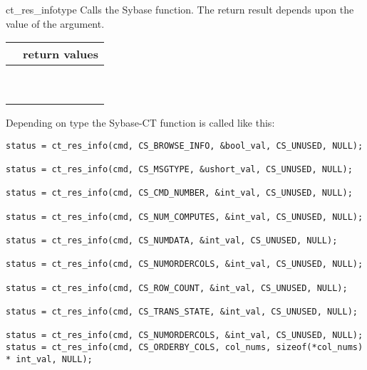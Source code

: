 \begin{methoddesc}[CS_COMMAND]{ct_res_info}{type}
Calls the Sybase  function.  The return result
depends upon the value of the  argument.

\begin{longtable}{l|l}
\var{type} & return values \\
\hline
\code{CS_BROWSE_INFO}   & \code{status, bool} \\
\code{CS_CMD_NUMBER}    & \code{status, int} \\
\code{CS_MSGTYPE}       & \code{status, int} \\
\code{CS_NUM_COMPUTES}  & \code{status, int} \\
\code{CS_NUMDATA}       & \code{status, int} \\
\code{CS_NUMORDER_COLS} & \code{status, int} \\
\code{CS_ORDERBY_COLS}  & \code{status, list of int} \\
\code{CS_ROW_COUNT}     & \code{status, int} \\
\code{CS_TRANS_STATE}   & \code{status, int} \\
\end{longtable}

Depending on type the Sybase-CT  function is
called like this:

\begin{verbatim}
status = ct_res_info(cmd, CS_BROWSE_INFO, &bool_val, CS_UNUSED, NULL);

status = ct_res_info(cmd, CS_MSGTYPE, &ushort_val, CS_UNUSED, NULL);

status = ct_res_info(cmd, CS_CMD_NUMBER, &int_val, CS_UNUSED, NULL);

status = ct_res_info(cmd, CS_NUM_COMPUTES, &int_val, CS_UNUSED, NULL);

status = ct_res_info(cmd, CS_NUMDATA, &int_val, CS_UNUSED, NULL);

status = ct_res_info(cmd, CS_NUMORDERCOLS, &int_val, CS_UNUSED, NULL);

status = ct_res_info(cmd, CS_ROW_COUNT, &int_val, CS_UNUSED, NULL);

status = ct_res_info(cmd, CS_TRANS_STATE, &int_val, CS_UNUSED, NULL);

status = ct_res_info(cmd, CS_NUMORDERCOLS, &int_val, CS_UNUSED, NULL);
status = ct_res_info(cmd, CS_ORDERBY_COLS, col_nums, sizeof(*col_nums) * int_val, NULL);
\end{verbatim}
\end{methoddesc}


